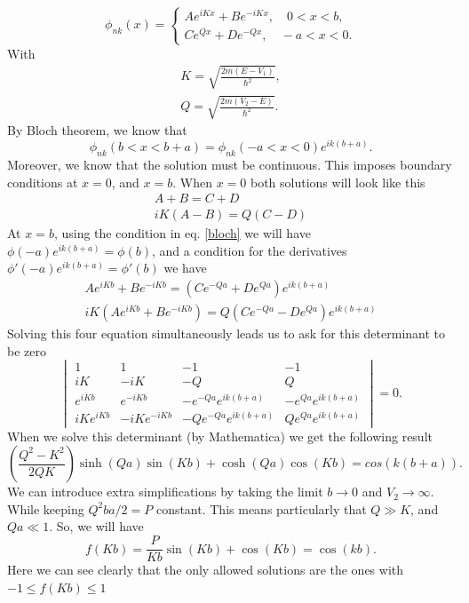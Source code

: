\begin{questions}
\begin{solution}
  \begin{equation}
    \phi_{nk}(x) = \begin{cases}
      Ae^{iKx} + Be^{-iKx}, \quad 0<x<b,\\
      Ce^{Qx} + De^{-Qx}, \quad -a < x < 0.
  \end{cases}
  \end{equation}
  With
  \begin{eqnarray}
    K = \sqrt{\frac{2m(E-V_1)}{\hbar^2}},\\
    Q = \sqrt{\frac{2m(V_2-E)}{\hbar^2}}.
  \end{eqnarray}
  By Bloch theorem, we know that
  \begin{equation}
    \phi_{nk}(b<x<b+a) = \phi_{nk}(-a<x<0)e^{ik(b+a)}.
    \label{bloch}
  \end{equation}
  Moreover, we know that the solution must be continuous. This imposes boundary conditions at $x=0$, and $x=b$.
  When $x=0$ both solutions will look like this
  \begin{eqnarray}
    A+B = C+D\\
    iK(A-B) = Q(C-D)
  \end{eqnarray}
  At $x=b$, using the condition in eq. \ref{bloch} we will have $\phi(-a)e^{ik(b+a)} = \phi(b)$, and a condition for the derivatives $\phi'(-a)e^{ik(b+a)}=\phi'(b)$ we have
  \begin{eqnarray}
    Ae^{iKb} + Be^{-iKb} = \left(Ce^{-Qa} + De^{Qa}\right)e^{ik(b+a)}\\
    iK\left(Ae^{iKb} + Be^{-iKb}\right) = Q\left(Ce^{-Qa} - De^{Qa}\right)e^{ik(b+a)}
  \end{eqnarray}
  Solving this four equation simultaneously leads us to ask for this determinant to be zero
  \begin{equation}
    \begin{vmatrix}
      1&1&-1&-1\\
      iK&-iK&-Q&Q\\
      e^{iKb}&e^{-iKb}&-e^{-Qa}e^{ik(b+a)}&-e^{Qa}e^{ik(b+a)}\\
      iKe^{iKb}&-iKe^{-iKb}&-Qe^{-Qa}e^{ik(b+a)}&Qe^{Qa}e^{ik(b+a)}
    \end{vmatrix} = 0.
  \end{equation}
  When we solve this determinant (by Mathematica) we get the following result
  \begin{equation}
    \left(\frac{Q^2 - K^2}{2QK}\right)\sinh(Qa)\sin(Kb) + \cosh(Qa)\cos(Kb) = cos(k(b+a)).
    \label{eq:num}
  \end{equation}
  We can introduce extra simplifications by taking the limit $b\rightarrow0$ and $V_2\rightarrow \infty$. While keeping $Q^2ba/2 = P$ constant. This means particularly that $Q\gg K$, and $Qa\ll 1$. So, we will have
  \begin{equation}
    f(Kb) = \frac{P}{Kb}\sin(Kb) + \cos(Kb) = \cos(kb).
    \label{alm}
  \end{equation}
  Here we can see clearly that the only allowed solutions are the ones with $-1\leq f(Kb)\leq1$


\end{solution}
\end{questions}
